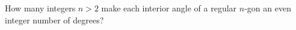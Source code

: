 How many integers $n>2$ make each interior angle of a regular $n$-gon an even integer number of degrees?
